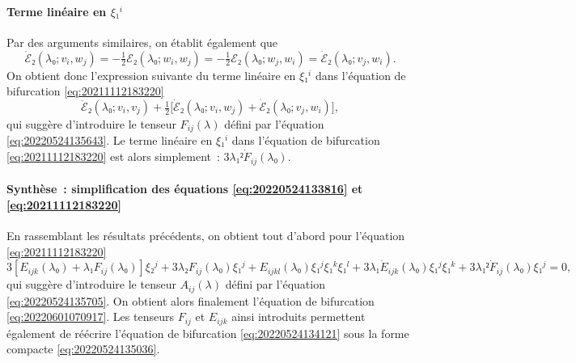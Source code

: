 \documentclass[12pt, final]{scrartcl}
\theoremstyle{definition}
\begin{document}
\paragraph{Terme linéaire en \(ξ₁^i\)} Par des arguments similaires, on établit
également que
\begin{equation}
  \dot{ℰ}₂(λ₀; v_i, w_j) = - \tfrac{1}{2} ℰ₂(λ₀; w_i, w_j) = - \tfrac{1}{2} ℰ₂(λ₀; w_j, w_i) = \dot{ℰ}₂(λ₀; v_j, w_i).
\end{equation}
On obtient donc l'expression suivante du terme linéaire en \(ξ₁^i\) dans
l'équation de bifurcation \eqref{eq:20211112183220}
\begin{equation}
  \ddot{ℰ}₂(λ₀; v_i, v_j) + \tfrac{1}{2}\bigl[\dot{ℰ}₂(λ₀; v_i, w_j) + \dot{ℰ}₂(λ₀; v_j, w_i)\bigr],
\end{equation}
qui suggère d'introduire le tenseur \(F_{i j}(λ)\) défini par l'équation
\eqref{eq:20220524135643}. Le terme linéaire en \(ξ₁^i\) dans l'équation de
bifurcation \eqref{eq:20211112183220} est alors simplement~:
\(3 λ₁² \dot{F}_{i j}(λ₀)\).

\paragraph{Synthèse~: simplification des équations \eqref{eq:20220524133816} et
  \eqref{eq:20211112183220}} En rassemblant les résultats précédents, on obtient
tout d'abord pour l'équation \eqref{eq:20211112183220}
\begin{equation}
  3 [E_{i j k}(λ₀) + λ₁ F_{i j} (λ₀)] ξ₂^j + 3 λ₂ F_{i j}(λ₀) ξ₁^j + E_{i j k l}(λ₀) ξ₁^j ξ₁^k ξ₁^l + 3 λ₁ \dot{E}_{i j k} (λ₀) ξ₁^j ξ₁^k + 3 λ₁² \dot{F}_{i j}(λ₀) ξ₁^j = 0,
\end{equation}
qui suggère d'introduire le tenseur \(A_{i j}(λ)\) défini par l'équation
\eqref{eq:20220524135705}. On obtient alors finalement l'équation de bifurcation
\eqref{eq:20220601070917}. Les tenseurs \(F_{i j}\) et \(E_{i j k}\) ainsi
introduits permettent également de réécrire l'équation de bifurcation
\eqref{eq:20220524134121} sous la forme compacte \eqref{eq:20220524135036}.
\end{document}
